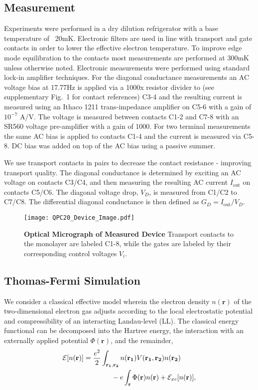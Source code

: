 \documentclass[reprint,prl,aps,superscriptaddress]{revtex4-1}
\newcommand{\be}{\begin{equation}}
\newcommand{\ee}{\end{equation}}
\begin{document}
\subsection{Measurement}
Experiments were performed in a dry dilution refrigerator with a base temperature of ~20mK.  Electronic filters are used in line with transport and gate contacts in order to lower the effective electron temperature.  To improve edge mode equilibration to the contacts most measurements are performed at 300mK unless otherwise noted.  Electronic measurements were performed using standard lock-in amplifier techniques.  For the diagonal conductance measurements an AC voltage bias at 17.77Hz is applied via a 1000x resistor divider to (see supplementary Fig.~1 for contact references) C3-4 and the resulting current is measured using an Ithaco 1211 trans-impedance amplifier on C5-6 with a gain of $10^{-7}$ A/V.  The voltage is measured between contacts C1-2 and C7-8 with an SR560 voltage pre-amplifier with a gain of 1000.  For two terminal measurements the same AC bias is applied to contacts C1-4 and the current is measured via C5-8.  DC bias was added on top of the AC bias using a passive summer.


We use transport contacts in pairs to decrease the contact resistance - improving transport quality. The diagonal conductance is determined by exciting an AC voltage on contacts C3/C4, and then measuring the resulting AC current $I_\mathrm{out}$ on contacts C5/C6. The diagonal voltage drop, $V_D$, is measured from C1/C2 to C7/C8. The differential diagonal conductance is then defined as $G_D = I_\mathrm{out}/V_D$.

\begin{figure*}[ht]
    \centering
    \texttt{[image: QPC20\_Device\_Image.pdf]}
    \caption{\textbf{Optical Micrograph of Measured Device} Transport contacts to the monolayer are  labeled C1-8, while the gates are labeled by their corresponding control voltages $V_i$.}
    \label{fig:supp_device}
\end{figure*}


\subsection{Thomas-Fermi Simulation}

We consider a classical effective model wherein the electron density $n(\mathbf{r})$ of the two-dimensional electron gas adjusts according to the local electrostatic potential and compressibility of an interacting Landau-level (LL).
The classical energy functional can be decomposed into the Hartree energy, the interaction with an externally applied  potential $\Phi(\mathbf{r})$, and the remainder,
\be
    \begin{aligned}
        \mathcal{E}[n(\mathbf{r})] &= \frac{e^2}{2}\int_{{\bf{r_1}, \bf{r_2}}} n({\bf{r_1}}) V({\bf{r_1}, \bf{r_2}}) n({\bf{r_2}})\\
        & \qquad \qquad - e\int_{\mathbf{r}} \Phi(\mathbf{r}) n(\mathbf{r}) + \mathcal{E}_{xc}[n(\mathbf{r})],
    \end{aligned}
\ee
\end{document}
